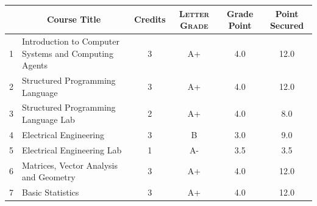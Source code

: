 \documentclass[11pt]{article}
\newcommand*{\numtwo}[1]{\pgfmathprintnumber[
                    fixed, precision=2, fixed zerofill=true]{#1}}
\begin{document}
                \begin{center}
                    \renewcommand{\arraystretch}{1.08}
                    
                \begin{tabular}{|c|l|c|>{\scshape}c|c|c|}
                \hline  \rule[-1ex]{0pt}{3.5ex} {\centering{\bf Course Code}} &  \multicolumn{1}{c|}{\textbf{Course Title}}  & {\bf Credits} & {\bf Letter Grade} & {\bf Grade Point} & {\bf Point Secured}  \\ 
                \hline   1 &  Introduction to Computer Systems and Computing Agents		 & 3 & A+ & 4.0 & 12.0 \\ %
                \hline   2 &  Structured Programming Language		 & 3 & A+ & 4.0 & 12.0 \\ %
                \hline   3 &  Structured Programming Language Lab		 & 2 & A+ & 4.0 & 8.0 \\ %
                \hline   4 &  Electrical Engineering		 & 3 & B & 3.0 & 9.0 \\ %
                \hline   5 &  Electrical Engineering Lab		 & 1 & A- & 3.5 & 3.5 \\ %
                \hline   6 &  Matrices, Vector Analysis and Geometry		 & 3 & A+ & 4.0 & 12.0 \\ %
                \hline   7 &  Basic Statistics		 & 3 & A+ & 4.0 & 12.0 \\ %

\hline                %
                \end{tabular}
                \end{center}
                \renewcommand{\arraystretch}{1.03}
\end{document}
